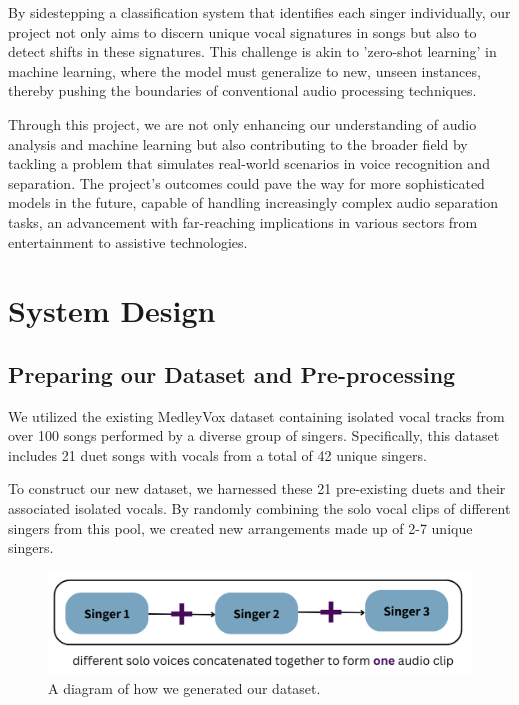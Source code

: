 \documentclass[conference]{IEEEtran}
\begin{document}
By sidestepping a classification system that identifies each singer individually, our project not only aims to discern unique vocal signatures in songs but also to detect shifts in these signatures. This challenge is akin to 'zero-shot learning' in machine learning, where the model must generalize to new, unseen instances, thereby pushing the boundaries of conventional audio processing techniques.

Through this project, we are not only enhancing our understanding of audio analysis and machine learning but also contributing to the broader field by tackling a problem that simulates real-world scenarios in voice recognition and separation. The project's outcomes could pave the way for more sophisticated models in the future, capable of handling increasingly complex audio separation tasks, an advancement with far-reaching implications in various sectors from entertainment to assistive technologies.

\section{System Design}
\subsection*{Preparing our Dataset and Pre-processing}

We utilized the existing MedleyVox dataset containing isolated vocal tracks from over 100 songs performed by a diverse group of singers. Specifically, this dataset includes 21 duet songs with vocals from a total of 42 unique singers.

To construct our new dataset, we harnessed these 21 pre-existing duets and their associated isolated vocals. By randomly combining the solo vocal clips of different singers from this pool, we created new arrangements made up of 2-7 unique singers.

\begin{figure}[ht]
    \centering
    \includegraphics[scale=0.25]{Singer.png}
    \caption{A diagram of how we generated our dataset.}
    \label{fig:Data}
\end{figure}
\end{document}
